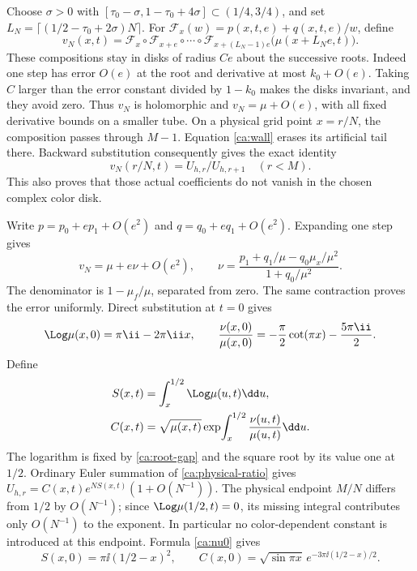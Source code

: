 Choose $\sigma>0$ with
$[\tau_0-\sigma,1-\tau_0+4\sigma]\subset(1/4,3/4)$, and set
$L_N=\lceil(1/2-\tau_0+2\sigma)N\rceil$. For
$\mathcal F_x(w)=p(x,t,e)+q(x,t,e)/w$, define
\begin{equation}\label{ca:continued-fraction}
 v_N(x,t)=\mathcal F_x\circ\mathcal F_{x+e}\circ\cdots
 \circ\mathcal F_{x+(L_N-1)e}
       \bigl(\mu(x+L_Ne,t)\bigr).
\end{equation}
These compositions stay in disks of radius $Ce$ about the successive roots. Indeed one step has error $O(e)$ at the root and derivative at most $k_0+O(e)$. Taking $C$ larger than the error constant divided by $1-k_0$ makes the disks invariant, and they avoid zero. Thus $v_N$ is holomorphic and
$v_N=\mu+O(e)$, with all fixed derivative bounds on a smaller tube. On a physical grid point $x=r/N$, the composition passes through $M-1$. Equation \eqref{ca:wall} erases its artificial tail there. Backward substitution consequently gives the exact identity
\begin{equation}\label{ca:physical-ratio}
 v_N(r/N,t)=U_{h,r}/U_{h,r+1}\quad(r<M).
\end{equation}
This also proves that those actual coefficients do not vanish in the chosen complex color disk.

Write $p=p_0+ep_1+O(e^2)$ and $q=q_0+eq_1+O(e^2)$. Expanding one step gives
\begin{equation}\label{ca:nu}
 v_N=\mu+e\nu+O(e^2),\qquad
 \nu=\frac{p_1+q_1/\mu-q_0\mu_x/\mu^2}{1+q_0/\mu^2}.
\end{equation}
The denominator is $1-\mu_f/\mu$, separated from zero. The same contraction proves the error uniformly. Direct substitution at $t=0$ gives
\begin{equation}\label{ca:nu0}
 \Log\mu(x,0)=\pi\ii-2\pi\ii x,\qquad
 \frac{\nu(x,0)}{\mu(x,0)}
 =-\frac{\pi}{2}\cot(\pi x)-\frac{5\pi\ii}{2}.
\end{equation}
Define
\begin{align}
 S(x,t)&=\int_x^{1/2}\Log\mu(u,t)\dd u,\notag\\
 C(x,t)&=\sqrt{\mu(x,t)}
             \exp\!\int_x^{1/2}\frac{\nu(u,t)}{\mu(u,t)}\dd u.\label{ca:SC}
\end{align}
The logarithm is fixed by \eqref{ca:root-gap} and the square root by its value one at $1/2$. Ordinary Euler summation of \eqref{ca:physical-ratio} gives
$U_{h,r}=C(x,t)e^{NS(x,t)}(1+O(N^{-1}))$.
The physical endpoint $M/N$ differs from $1/2$ by $O(N^{-1})$; since
$\Log\mu(1/2,t)=0$, its missing integral contributes only $O(N^{-1})$ to the exponent. In particular no color-dependent constant is introduced at this endpoint. Formula \eqref{ca:nu0} gives
\begin{equation}\label{ca:SC0}
 S(x,0)=\pi\ii(1/2-x)^2,\qquad
 C(x,0)=\sqrt{\sin\pi x}\,
                  e^{-3\pi\ii(1/2-x)/2}.
\end{equation}

